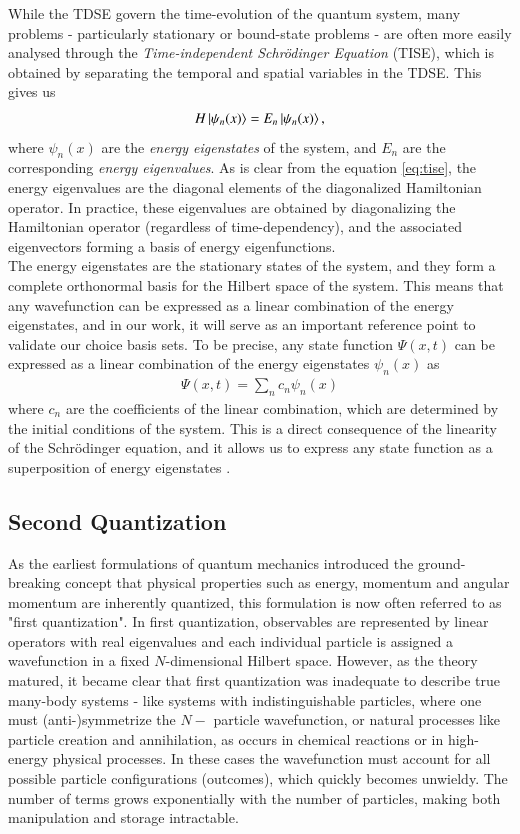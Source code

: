 \documentclass{subfiles}
\begin{document}
While the TDSE govern the time-evolution of the quantum system, many problems - particularly stationary or bound-state problems - are often more easily analysed through the \emph{Time-independent Schrödinger Equation} (TISE), which is obtained by separating the temporal and spatial variables in the TDSE. This gives us
\begin{equation}
    H\ket{\psi_n(x)} = E_n\ket{\psi_n(x)}\label{eq:tise},
\end{equation}
where $\psi_n(x)$ are the \emph{energy eigenstates} of the system, and $E_n$ are the corresponding \emph{energy eigenvalues}. As is clear from the equation \eqref{eq:tise}, the energy eigenvalues are the diagonal elements of the diagonalized Hamiltonian operator. In practice, these eigenvalues are obtained by diagonalizing the Hamiltonian operator (regardless of time-dependency), and the associated eigenvectors forming a basis of energy eigenfunctions. \\

The energy eigenstates are the stationary states of the system, and they form a complete orthonormal basis for the Hilbert space of the system. This means that any wavefunction can be expressed as a linear combination of the energy eigenstates, and in our work, it will serve as an important reference point to validate our choice basis sets. To be precise, any state function $\Psi(x, t)$ can be expressed as a linear combination of the energy eigenstates $\psi_n(x)$ as
\begin{align*}
    \Psi(x, t) = \sum_n c_n\psi_n(x)
\end{align*}
where $c_n$ are the coefficients of the linear combination, which are determined by the initial conditions of the system. This is a direct consequence of the linearity of the Schrödinger equation, and it allows us to express any state function as a superposition of energy eigenstates \cite{griffiths2018introduction, berera2021quantum}.

\subsection{Second Quantization}
As the earliest formulations of quantum mechanics introduced the ground-breaking concept that physical properties such as energy, momentum and angular momentum are inherently quantized, this formulation is now often referred to as "first quantization". In first quantization, observables are represented by linear operators with real eigenvalues and each individual particle is assigned a wavefunction in a fixed $N$-dimensional Hilbert space.
However, as the theory matured, it became clear that first quantization was inadequate to describe true many-body systems - like systems with indistinguishable particles, where one must (anti-)symmetrize the $N-$ particle wavefunction, or natural processes like particle creation and annihilation, as occurs in chemical reactions or in high-energy physical processes. In these cases the wavefunction must account for all possible particle configurations (outcomes), which quickly becomes unwieldy. The number of terms grows exponentially with the number of particles, making both manipulation and storage intractable.
\end{document}
